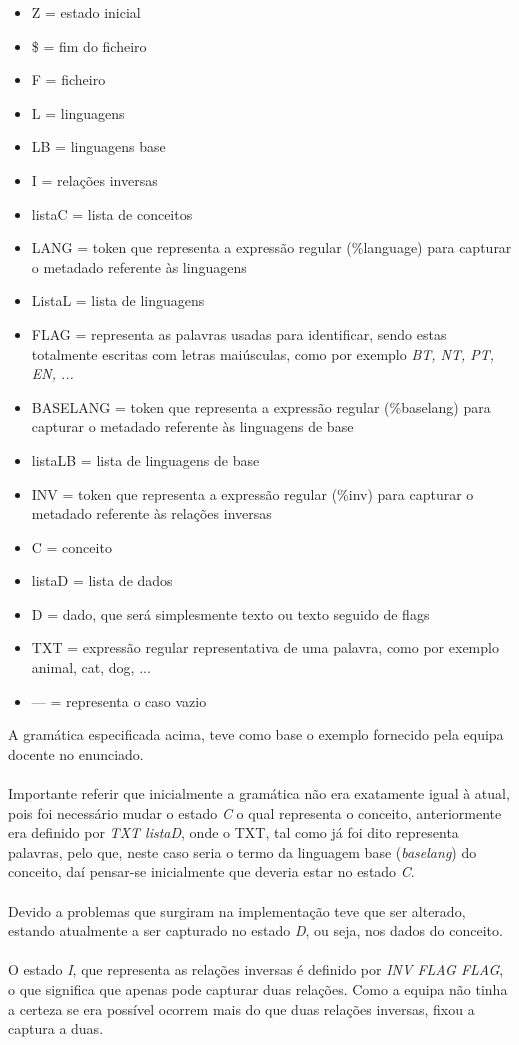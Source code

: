 \documentclass[11pt,a4paper]{report}%
\begin{document}
\begin{itemize}
  \item Z = estado inicial
  \item \$ = fim do ficheiro
  \item F = ficheiro
  \item L = linguagens
  \item LB = linguagens base
  \item I = relações inversas
  \item listaC = lista de conceitos
  \item LANG = token que representa a expressão regular (\%language) para capturar o metadado referente às linguagens
  \item ListaL = lista de linguagens
  \item FLAG = representa as palavras usadas para identificar, sendo estas totalmente escritas com letras maiúsculas, como por exemplo \emph{BT, NT, PT, EN, ...}
  \item BASELANG = token que representa a expressão regular (\%baselang) para capturar o metadado referente às linguagens de base
  \item listaLB = lista de linguagens de base
  \item INV = token que representa a expressão regular (\%inv) para capturar o metadado referente às relações inversas
  \item C = conceito
  \item listaD = lista de dados
  \item D = dado, que será simplesmente texto ou texto seguido de flags
  \item TXT = expressão regular representativa de uma palavra, como por exemplo animal, cat, dog, ...
  \item --- = representa o caso vazio
\end{itemize}

A gramática especificada acima, teve como base o exemplo fornecido pela equipa docente no enunciado. \\\\Importante referir que inicialmente a gramática não era exatamente igual à atual, pois foi necessário mudar o estado \emph{C} o qual representa o conceito, anteriormente era definido por \emph{TXT listaD}, onde o TXT, tal como já foi dito representa palavras, pelo que, neste caso seria o termo da linguagem base (\emph{baselang}) do conceito, daí pensar-se inicialmente que deveria estar no estado \emph{C}. \\\\Devido a problemas que surgiram na implementação teve que ser alterado, estando atualmente a ser capturado no estado \emph{D}, ou seja, nos dados do conceito.\\\\
O estado \emph{I}, que representa as relações inversas é definido por \emph{INV FLAG FLAG}, o que significa que apenas pode capturar duas relações. Como a equipa não tinha a certeza se era possível ocorrem mais do que duas relações inversas, fixou a captura a duas.
\newpage
\end{document}
